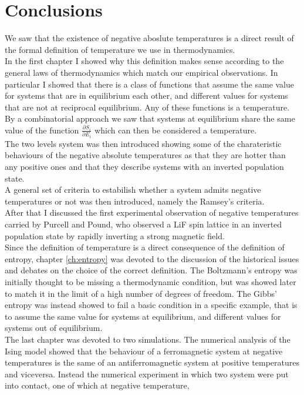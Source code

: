 \chapter{Conclusions}
We saw that the existence of negative aboslute temperatures is a direct result of the formal definition of temperature we use in thermodynamics. \\
In the first chapter I showed why this definition makes sense according to the general laws of thermodynamics which match our empirical observations. In particular I showed that there is a class of 
functions that assume the same value for systems that are in equilibrium each other, and different values for systems that are not at reciprocal equilibrium. Any of these functions is a temperature. \\
By a combinatorial approach we saw that systems at equilibrium share the same value of the function $\frac{\partial S_i}{\partial E_i}$ which can then be considered a temperature. \\
The two levels system was then introduced showing some of the charateristic behaviours of the negative absolute temperatures as that they are hotter than any positive ones and that they describe systems with an inverted population state. \\
A general set of criteria to estabilish whether a system admits negative temperatures or not was then introduced, namely the Ramsey's criteria. \\
After that I discussed the first experimental observation of negative temperatures carried by Purcell and Pound, who observed a LiF spin lattice in an inverted population state by rapidly inverting a strong magnetic field. \\
Since the definition of temperature is a direct consequence of the definition of entropy, chapter \ref{ch:entropy} was devoted to the discussion of the historical issues and debates on the choice of the correct definition. The Boltzmann's entropy was initially thought to be 
missing a thermodynamic condition, but was showed later to match it in the limit of a high number of degrees of freedom. The Gibbs' entropy was instead showed to fail a basic condition in a specific example, that is to assume the same value for systems at equilibrium, and different values for systems out of equilibrium. \\
The last chapter was devoted to two simulations. The numerical analysis of the Ising model showed that the behaviour of a ferromagnetic system at negative temperatures is the same of an antiferromagnetic system at positive temperatures and viceversa. Instead the numerical experiment in which two system were put into contact, one of which at negative temperature,
